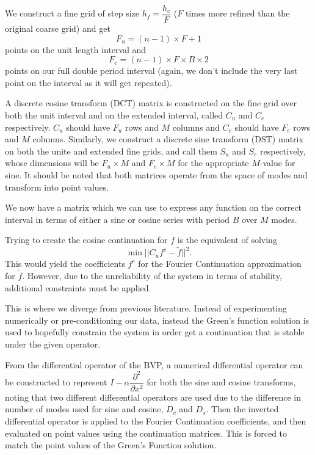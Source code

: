 \documentclass[11pt]{amsart}
\begin{document}
We construct a fine grid of step size $h_f=\dfrac{h_c}{F}$ ($F$ times more refined than the original coarse grid) and get 
\begin{equation}
F_u=(n-1)\times F + 1
\end{equation} points on the unit length interval and 
\begin{equation}
F_e=(n-1)\times F \times B \times 2
\end{equation} points on our full double period interval (again, we don't include the very last point on the interval as it will get repeated). 

A discrete cosine transform (DCT) matrix is constructed on the fine grid over both the unit interval and on the extended interval, called $C_u$ and $C_e$ respectively.  $C_u$ should have $F_u$ rows and $M$ columns and $C_e$ should have $F_e$ rows and $M$ columns.  Similarly, we construct a discrete sine transform (DST) matrix on both the unite and extended fine grids, and call them $S_u$ and $S_e$ respectively, whose dimensions will be $F_u \times M$ and $F_e \times M$ for the appropriate $M$-value for sine.  It should be noted that both matrices operate from the space of modes and transform into point values.   

We now have a matrix  which we can use to express any function on the correct interval in terms of either a sine or cosine series with period $B$ over $M$ modes.  

Trying to create the cosine continuation for $f$ is the equivalent of solving
\begin{equation}
\min ||C_u f^c - \tilde{f} ||^2 .
\end{equation}
This would yield the coefficients $f^c$ for the Fourier Continuation approximation for $\tilde{f}$.  However, due to the unreliability of the system in terms of stability, additional constraints must be applied.  

This is where we diverge from previous literature.  Instead of experimenting numerically or pre-conditioning our data, instead the Green's function solution is used to hopefully constrain the system in order get a continuation that is stable under the given operator.  

From the differential operator of the BVP, a numerical differential operator can be constructed to represent $I-\alpha \dfrac{\partial ^2 }{\partial x^2}$ for both the sine and cosine transforms, noting that two different differential operators are used due to the difference in number of modes used for sine and cosine, $D_c$ and $D_s$. Then the inverted differential operator is applied to the Fourier Continuation coefficients, and then evaluated on point values using the continuation matrices. This is forced to match the point values of the Green's Function solution.
\end{document}
